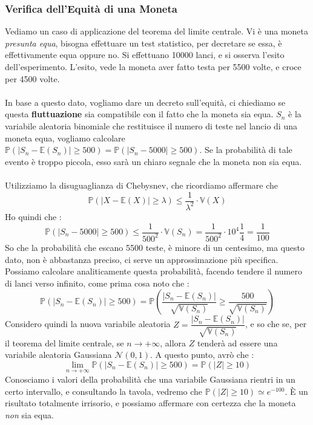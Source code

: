 \documentclass[12pt, letterpaper]{article}
\newcommand{\E}{{\mathbb E}}
\newcommand{\V}{{\mathbb V}}
\newcommand{\acc}{\\\hphantom{}\\}
\newcommand{\Prob}{{\mathbb P}}
\begin{document}
\subsubsection{Verifica dell'Equità di una Moneta}
Vediamo un caso di applicazione del teorema del limite centrale. Vi è una 
moneta \textit{presunta equa}, bisogna effettuare un test statistico, per decretare se essa, è effettivamente 
equa oppure no. Si effettuano 10000 lanci, e si osserva l'esito dell'esperimento. L'esito, vede 
la moneta aver fatto testa per 5500 volte, e croce per 4500 volte.\acc  In base a questo dato, vogliamo 
dare un decreto sull'equità, ci chiediamo se questa \textbf{fluttuazione} sia compatibile con il 
fatto che la moneta sia equa. \(S_n\) è la variabile aleatoria binomiale che restituisce il numero di teste 
nel lancio di una moneta equa, vogliamo calcolare \(\Prob(|S_n-\E(S_n)|\ge 500)=\Prob(|S_n-5000|\ge 500)\).
Se la probabilità di tale evento è troppo piccola, esso sarà un chiaro segnale che la moneta non sia equa.\acc
Utilizziamo la disuguaglianza di Chebysnev, che ricordiamo affermare che $$
\Prob(|X-\E(X)|\ge\lambda)\le \dfrac{1}{\lambda^2}\cdot \V(X)  $$
Ho quindi che :$$
\Prob(|S_n-5000|\ge 500) \le \dfrac{1}{500^2}\cdot \V(S_n)= \dfrac{1}{500^2}\cdot 10^4\dfrac{1}{4}=\dfrac{1}{100}$$
So che la probabilità che escano 5500 teste, è minore di un centesimo, ma questo dato, non è abbastanza preciso, ci serve 
un approssimazione più specifica. Possiamo calcolare analiticamente questa probabilità, facendo tendere 
il numero di lanci verso infinito, come prima cosa noto che :$$
\Prob(|S_n-\E(S_n)|\ge 500)=\Prob(\dfrac{|S_n-\E(S_n)|}{\sqrt{\V(S_n)}}\ge \dfrac{500}{\sqrt{\V(S_n)}})$$
Considero quindi la nuova variabile aleatoria \(Z=\dfrac{|S_n-\E(S_n)|}{\sqrt{\V(S_n)}}\), e so che 
se, per il teorema del limite centrale, se \(n\rightarrow +\infty\), allora \(Z\) tenderà ad essere 
una variabile aleatoria Gaussiana \(\mathcal{N}(0,1)\). A questo punto, avrò che :
$$\lim_{n\rightarrow +\infty}\Prob(|S_n-\E(S_n)|\ge 500)=\Prob(|Z|\ge 10)$$
Conosciamo i valori della probabilità che una variabile Gaussiana rientri in un certo intervallo, 
e consultando la tavola, vedremo che \(\Prob(|Z|\ge 10)\simeq e^{-100}\). È un risultato totalmente 
irrisorio, e possiamo affermare con certezza che la moneta \textit{non} sia equa.
\end{document}
